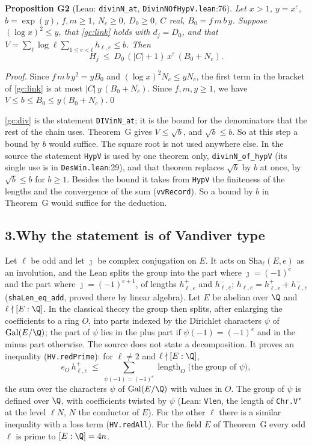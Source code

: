 \documentclass[11pt,letterpaper]{article}
\begin{document}
\textbf{Proposition G2} (Lean: \texttt{divinN\_at}, \texttt{DivinNOfHypV.lean}:76). \emph{Let $x>1$,
$y=x^{\varepsilon}$, $b=\exp(y)$, $f,m\ge1$, $N_c\ge0$, $D_0\ge0$, $C$ real, $B_0=f\,m\,b\,y$. Suppose
$(\log x)^2\le y$, that \eqref{gc:link} holds with $d_j=D_0$, and that
$V=\sum_\ell\log\ell\sum_{1\le e<t}h_{\ell,e}\le b$. Then}
\begin{equation}\label{gc:div}
 H_j\ \le\ D_0\,(|C|+1)\,x^{\varepsilon}\,(B_0+N_c).
\end{equation}

\emph{Proof.} Since $f\,m\,b\,y^{2}=yB_0$ and $(\log x)^2N_c\le yN_c$, the first term in the bracket of
\eqref{gc:link} is at most $|C|\,y\,(B_0+N_c)$. Since $f,m,y\ge1$, we have $V\le b\le B_0\le y(B_0+N_c)$.\qed

\eqref{gc:div} is the statement \texttt{DIVinN\_at}; it is the bound for the denominators that the rest of
the chain uses. Theorem~G gives $V\le\sqrt b$, and $\sqrt b\le b$. So at this step a bound by $b$ would
suffice. The square root is not used anywhere else. In the source the statement \texttt{HypV} is used by one
theorem only, \texttt{divinN\_of\_hypV} (its single use is in \texttt{DesWin.lean}:29), and that theorem
replaces $\sqrt b$ by $b$ at once, by $\sqrt b\le b$ for $b\ge1$. Besides the bound it takes from
\texttt{HypV} the finiteness of the lengths and the convergence of the sum (\texttt{vvRecord}). So a bound by
$b$ in Theorem~G would suffice for the deduction.

\subsection*{3.\quad Why the statement is of Vandiver type}

Let $\ell$ be odd and let $\jmath$ be complex conjugation on $E$. It acts on $\mathrm{Sha}_\ell(E,e)$ as an
involution, and the Lean splits the group into the part where $\jmath=(-1)^{e}$ and the part where
$\jmath=(-1)^{e+1}$, of lengths $h^{+}_{\ell,e}$ and $h^{-}_{\ell,e}$; $h_{\ell,e}=h^+_{\ell,e}+h^-_{\ell,e}$
(\texttt{shaLen\_eq\_add}, proved there by linear algebra). Let $E$ be abelian over $\Q$ and
$\ell\nmid[E:\Q]$. In the classical theory the group then splits, after enlarging the coefficients to a ring
$O$, into parts indexed by the Dirichlet characters $\psi$ of $\mathrm{Gal}(E/\Q)$; the part of $\psi$ lies
in the plus part if $\psi(-1)=(-1)^{e}$ and in the minus part otherwise. The source does not state a
decomposition. It proves an inequality (\texttt{HV.redPrime}): for $\ell\ne2$ and $\ell\nmid[E:\Q]$,
\begin{equation}\label{D:337}
 e_O\,h^{+}_{\ell,e}\ \le\ \sum_{\psi(-1)=(-1)^{e}}\operatorname{length}_O\big(\text{the group of }\psi\big),
\end{equation}
the sum over the characters $\psi$ of $\mathrm{Gal}(E/\Q)$ with values in $O$. The group of $\psi$ is defined
over $\Q$, with coefficients twisted by $\psi$ (Lean: \texttt{Vlen}, the length of \texttt{Chr.V'} at the
level $\ell N$, $N$ the conductor of $E$). For the other $\ell$ there is a similar inequality with a loss
term (\texttt{HV.redAll}). For the field $E$ of Theorem~G every odd $\ell$ is prime to $[E:\Q]=4n$.
\end{document}
